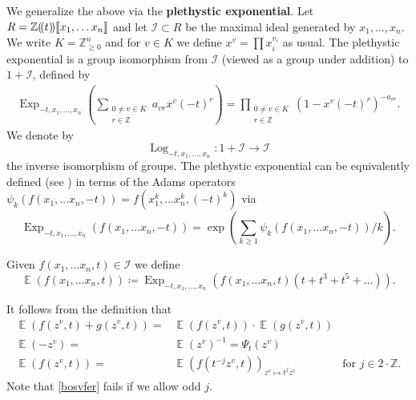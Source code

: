\documentclass{amsart}
\DeclareMathOperator{\EE}{\mathbb{E}}
\newcommand{\lcbs}{(\!(}
\newcommand{\rcbs}{)\!)}
\DeclareMathOperator{\Exp}{Exp}
\DeclareMathOperator{\Log}{Log}
\def\!{\mskip-\thinmuskip}
\let\llb=\llbracket
\let\rrb=\rrbracket
\let\bb=\mathbb
\theoremstyle{plain}%
\theoremstyle{definition}
\theoremstyle{remark}
\begin{document}
We generalize the above via the \textbf{plethystic exponential}.  Let $R=\mathbb{Z}\lcbs t\rcbs \llb x_1,\ldots x_n\rrb$ and let $\mathscr{I}\subset R$ be the maximal ideal generated by $x_1,\ldots,x_n$.  We write $K=\mathbb{Z}_{\geq 0}^n$ and for $v\in K$ we define $x^v=\prod x_i^{v_i}$ as usual.  The plethystic exponential is a group isomorphism from $\mathscr{I}$  (viewed as a group under addition) to $1+\mathscr{I}$, defined by 
\begin{align*}
    \Exp_{-t,x_1,\ldots,x_n}\left(\sum_{\substack{0\neq v\in K\\r\in \bb{Z}}} a_{vr} x^v(-t)^r\right) = \prod_{\substack{0\neq v\in K\\r\in \bb{Z}}} (1-x^v(-t)^r)^{-a_{vr}}.
\end{align*}
We denote by
\begin{equation}
    \label{Log_def}
    \Log_{-t,x_1,\ldots,x_n}\colon 1+\mathscr{I} \rightarrow \mathscr{I}
\end{equation}
the inverse isomorphism of groups.  The plethystic exponential can be equivalently defined (see \cite{Get96}) in terms of the Adams operators $\psi_k(f(x_1,\ldots x_n,-t))=f(x_1^k,\ldots x_n^k,(-t)^k)$ via
\[
\Exp_{-t,x_1,\ldots,x_n}(f(x_1,\ldots x_n,-t))=\exp\left(\sum_{k\geq 1}\psi_k(f(x_1,\ldots x_n,-t))/k\right).
\]

Given $f(x_1,\ldots x_n,t)\in \mathscr{I}$ we define 
\[\EE(f(x_1,\ldots x_n,t))\coloneqq \Exp_{-t,x_1,\ldots,x_n}\left(f(x_1,\ldots x_n,t)(t+t^3+t^5+\ldots)\right).\]


It follows from the definition that
\begin{align}\label{plus-prod}
    \EE(f(z^v,t)+g(z^v,t))=&\EE(f(z^v,t))\cdot \EE(g(z^v,t))\\
\label{EPsi}
\EE(-z^v)=&\EE(z^v)^{-1}=\Psi_t(z^v)\\
    \label{bosvfer}
\EE(f(z^v,t))=&\EE(f(t^{-j}z^v,t))_{z^{v}\mapsto t^{j}z^{v}}&\textrm{for }j\in 2\cdot\mathbb{Z}.
\end{align}
Note that \eqref{bosvfer} fails if we allow odd $j$.
\end{document}
